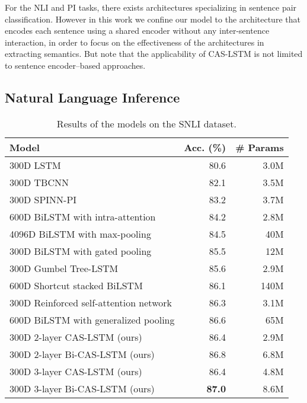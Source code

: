 \documentclass[wcp]{jmlr}
\begin{document}
    For the NLI and PI tasks, there exists architectures specializing in sentence pair classification.
    However in this work we confine our model to the architecture that encodes each sentence using a shared encoder without any inter-sentence interaction, in order to focus on the effectiveness of the architectures in extracting semantics.
    But note that the applicability of CAS-LSTM is not limited to sentence encoder--based approaches.
    
    \subsection{Natural Language Inference}
    
    \begin{table*}[t]
        \centering
        \begin{tabular}{l r r}
            \hline
            \bf{Model} & \bf{Acc. (\%)} & \bf {\# Params} \\
            \hline
            300D LSTM \citep{bowman2016spinn} & 80.6 & 3.0M \\
            300D TBCNN \citep{mou2016snli} & 82.1 & 3.5M \\
            300D SPINN-PI \citep{bowman2016spinn} & 83.2 & 3.7M \\
            600D BiLSTM with intra-attention \citep{liu2016learning} & 84.2 & 2.8M \\
            4096D BiLSTM with max-pooling \citep{conneau2017infersent} & 84.5 & 40M \\
            300D BiLSTM with gated pooling \citep{chen2017gated} & 85.5 & 12M \\
            300D Gumbel Tree-LSTM \citep{choi2018learning} & 85.6 & 2.9M \\
            600D Shortcut stacked BiLSTM \citep{nie2017shortcut} & 86.1 & 140M \\
            300D Reinforced self-attention network \citep{shen2018reinforced} & 86.3 & 3.1M \\
            600D BiLSTM with generalized pooling \citep{chen2018generalized} & 86.6 & 65M \\
            \hline
            300D 2-layer CAS-LSTM (ours) & 86.4 & 2.9M \\
            300D 2-layer Bi-CAS-LSTM (ours) & {86.8} & 6.8M \\
            300D 3-layer CAS-LSTM (ours) & 86.4 & 4.8M  \\
            300D 3-layer Bi-CAS-LSTM (ours) & \bf{87.0} & 8.6M \\
            \hline
        \end{tabular}
        \caption{Results of the models on the SNLI dataset.}
        \label{table:snli}
    \end{table*}
    
\end{document}
